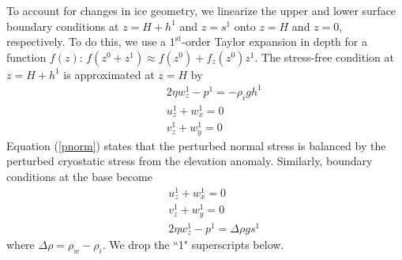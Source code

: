 \documentclass[paper=a4, fontsize=11pt]{article} %
\begin{document}
To account for changes in ice geometry,
we linearize the upper and lower surface boundary conditions at $z=H +  h^1$
and $z= s^1$ onto $z=H$ and $z=0$, respectively.
To do this, we
use a $1^\mathrm{st}$-order Taylor expansion in depth for a function $f(z)$:
$ f(z^0 + z^1) \approx f(z^0) + f_z(z^0)z^1. $
The stress-free condition at $z=H+h^1$ is approximated at $z=H$ by
\begin{eqnarray}
&&2\eta w_z^1 - p^1 = -\rho_i g h^1 \label{pnorm} \\
&&u_z^1 +w_x^1 = 0\label{pshear1}\\
&&v_z^1 +w_y^1 = 0 \label{pshear2}
\end{eqnarray}
Equation (\ref{pnorm}) states that the perturbed normal stress is balanced
by the perturbed cryostatic stress from the elevation anomaly.
Similarly, boundary conditions at the base become
\begin{eqnarray}
&&u_z^1 + w_x^1 = 0  \label{pslaw1}   \\
&&v_z^1 +w_y^1 = 0 \label{pslaw2}\\
&&2\eta w_z^1 - p^1 = \Delta\rho g s^1
\end{eqnarray}
where $\Delta\rho = \rho_w-\rho_i$.
We drop the ``1" superscripts below.
\end{document}
